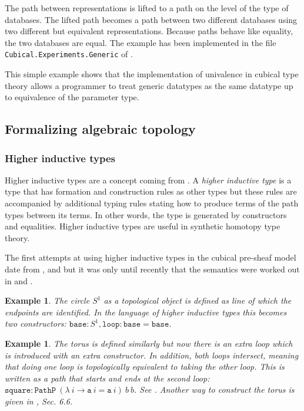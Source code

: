 \documentclass[12pt,a4paper,twoside,xetex]{book} %
\newcommand{\keyword}[1]{\emph{#1}\index{#1}}
\newtheorem{example}[theorem]{Example}
\newcommand{\op}[1]{\mathtt{#1}}
\begin{document}
The path between representations is lifted to a path on the level of the type 
of databases. The lifted path becomes a path between two different databases 
using two different but equivalent representations. Because paths behave like 
equality, the two databases are equal. The example has been implemented in the 
file \texttt{Cubical.Experiments.Generic} of \cite{Moertberg2018}.

This simple example shows that the implementation of univalence in cubical type 
theory allows a programmer to treat generic datatypes as the same datatype up 
to equivalence of the parameter type.

\subsection{Formalizing algebraic topology}

\subsubsection{Higher inductive types}\label{hit}

Higher inductive types are a concept coming from \cite{Voevodsky2013}. A 
\keyword{higher inductive type} is a type that has formation and construction 
rules  as other types but these rules are accompanied by additional typing 
rules stating how to produce terms of the path types between its terms. In 
other words, the type is generated by constructors and equalities. Higher 
inductive types are useful in synthetic homotopy type theory.

The first attempts at using higher inductive types in the cubical pre-sheaf 
model date from \cite{Licata2015}, \cite{Huber2016} and \cite{Cohen2016} but it 
was only until recently that the semantics were worked out in \cite 
{Lumsdaine2017} and  \cite{Coquand2018}.



\begin{example}
The \keyword{circle} $S^1$ as a topological object is defined as line of which 
the endpoints are identified. In the language of higher inductive types this 
becomes two constructors: $\op{base} : S^1,  \op{loop} : \op{base} = \op{base}$.
\end{example}

\begin{example}
The \keyword{torus} is defined similarly but now there is an extra loop which is 
introduced with an extra constructor. In addition, both loops intersect, 
meaning that doing one loop is topologically equivalent to taking the other 
loop. This is written as a path that starts and ends at the second loop: 
$\op{square} : \op{PathP} \ (\lambda \ i \rightarrow \op{a} \ i = \op{a} \ i) \ 
b  \ b$. See . Another way to construct the torus is given in 
\cite{Voevodsky2013}, Sec. 6.6.
\end{example}
\end{document}
